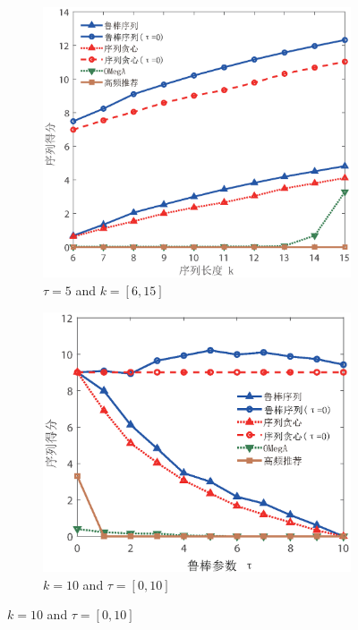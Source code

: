\begin{figure}[H]
    \medskip

    \begin{subfigure}{0.45\textwidth}
       \includegraphics[width=\linewidth]{figure/rosenets/wik/wik-seq}
        \caption{$\tau=5$ and $k=[6,15]$}
        \label{fig:wik-seq}
    \end{subfigure}
    \hfill
    \begin{subfigure}{0.45\textwidth}
        \includegraphics[width=\linewidth]{figure/rosenets/wik/wik-seq-t}
        \caption{$k=10$ and $\tau=[0,10]$}
        \label{fig:wik-seq-t}
    \end{subfigure}


\end{figure}
